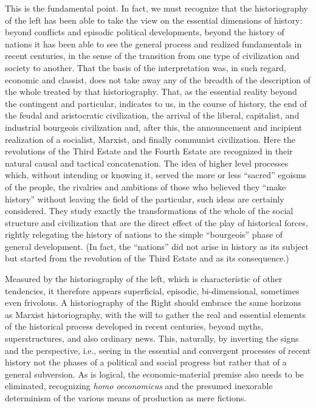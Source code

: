 This is the fundamental point. In fact, we must recognize that the historiography of the left has been able to take the view on the essential dimensions of history: beyond conflicts and episodic political developments, beyond the history of nations it has been able to see the general process and realized fundamentals in recent centuries, in the sense of the transition from one type of civilization and society to another. That the basis of the interpretation was, in such regard, economic and classist, does not take away any of the breadth of the description of the whole treated by that historiography. That, as the essential reality beyond the contingent and particular, indicates to us, in the course of history, the end of the feudal and aristocratic civilization, the arrival of the liberal, capitalist, and industrial bourgeois civilization and, after this, the announcement and incipient realization of a socialist, Marxist, and finally communist civilization. Here the revolutions of the Third Estate and the Fourth Estate are recognized in their natural causal and tactical concatenation. The idea of higher level processes which, without intending or knowing it, served the more or less ``sacred'' egoisms of the people, the rivalries and ambitions of those who believed they ``make history'' without leaving the field of the particular, such ideas are certainly considered. They study exactly the transformations of the whole of the social structure and civilization that are the direct effect of the play of historical forces, rightly relegating the history of nations to the simple ``bourgeois'' phase of general development. (In fact, the ``nations'' did not arise in history as its subject but started from the revolution of the Third Estate and as its consequence.)

Measured by the historiography of the left, which is characteristic of other tendencies, it therefore appears superficial, episodic, bi-dimensional, sometimes even frivolous. A historiography of the Right should embrace the same horizons as Marxist historiography, with the will to gather the real and essential elements of the historical process developed in recent centuries, beyond myths, superstructures, and also ordinary news. This, naturally, by inverting the signs and the perspective, i.e., seeing in the essential and convergent processes of recent history not the phases of a political and social progress but rather that of a general subversion. As is logical, the economic-material premise also needs to be eliminated, recognizing \emph{homo oeconomicus} and the presumed inexorable determinism of the various means of production as mere fictions.


